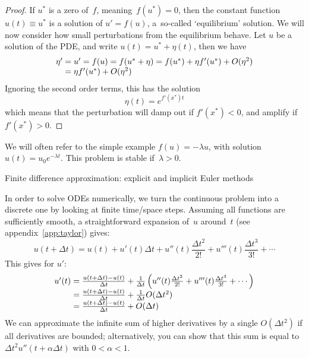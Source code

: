 \begin{proof}
  If $u^*$ is a zero of~$f$, meaning~$f(u^*)=0$, then the
  constant function $u(t)\equiv u^*$ is a solution of $u'=f(u)$,
  a~so-called `equilibrium' solution. We will now consider how small
  perturbations from the equilibrium behave. Let $u$ be a solution of
  the PDE, and write $u(t)=u^*+\eta(t)$, then we have
  \begin{equation}
  \begin{array}{r@{{}={}}l}
    \eta'&u'=f(u)=f(u^*+\eta)=f(u^*)+\eta f'(u^*)+O(\eta^2)\\
    &\eta f'(u^*)+O(\eta^2)
  \end{array}
  \end{equation}
  Ignoring the second order terms, this has the solution
  \begin{equation}
    \eta(t)=e^{f'(x^*)t}
  \end{equation}
  which means that the perturbation will damp out if $f'(x^*)<0$,
  and amplify if~$f'(x^*)>0$.
\end{proof}

We will often refer to the simple example
$f(u)=-\lambda u$, with solution $u(t)=u_0e^{-\lambda t}$. This
problem is stable if~$\lambda>0$.

 {Finite difference approximation: explicit and implicit Euler methods}
\label{sec:fd-ode}

In order to solve \acp{ODE} numerically, we turn the continuous
problem into a discrete one by looking at finite time/space steps.
Assuming all functions are sufficiently smooth, a straightforward
 expansion of~$u$ around~$t$
%
(see appendix~\ref{app:taylor})
%
gives:
\begin{equation}
  u(t+\Delta t)=u(t)+u'(t)\Delta t+u''(t)\frac{\Delta t^2}{2!}
  + u'''(t)\frac{\Delta t^3}{3!}+\cdots
\end{equation}
This gives for $u'$:
\begin{equation}
  \begin{array}{r@{{}={}}l}
  u'(t) & \frac{u(t+\Delta t)-u(t)}{\Delta t}+\frac1{\Delta t}
                \left(u''(t)\frac{\Delta t^2}{2!}
                + u'''(t)\frac{\Delta t^3}{3!}+\cdots\right)\\
        & \frac{u(t+\Delta t)-u(t)}{\Delta t}+\frac1{\Delta t}O(\Delta t^2)\\
        & \frac{u(t+\Delta t)-u(t)}{\Delta t}+O(\Delta t)    
  \end{array}
  \label{eq:forwarddifference}
\end{equation}
We can approximate the infinite sum of higher derivatives by a single
$O(\Delta t^2)$ if all derivatives are bounded; alternatively,
you can show that this sum is equal to $\Delta
t^2u''(t+\alpha\Delta t)$ with $0<\alpha<1$.

